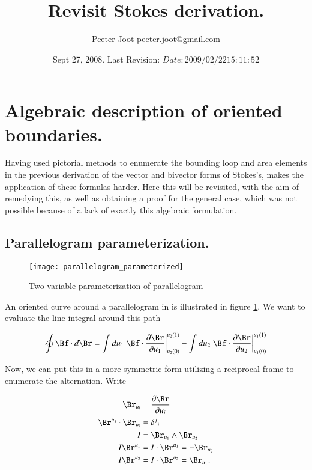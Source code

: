 \documentclass{article}
\title{ Revisit Stokes derivation. }
\author{Peeter Joot \quad peeter.joot@gmail.com}
\date{ Sept 27, 2008.  Last Revision: $Date: 2009/02/22 15:11:52 $ }
\newcommand{\PD}[2]{\frac{\partial {#2}}{\partial {#1}}}
\begin{document}
\maketitle{}

\tableofcontents

\section{ Algebraic description of oriented boundaries. }

Having used pictorial methods to enumerate the bounding loop and area elements 
\cite{PJStokes1}
in the previous derivation
of the vector and bivector forms of Stokes's, makes the application
of these formulas harder.  Here this will be revisited, with the aim of remedying this, as well as
obtaining a proof for the general case, which was not possible because of a lack of exactly this
algebraic formulation.

\subsection{ Parallelogram parameterization. }

\begin{figure}[htp]
\centering
\texttt{[image: parallelogram\_parameterized]}
\caption{Two variable parameterization of  parallelogram}\label{fig:parallelogram}
\end{figure}

An oriented curve around a parallelogram in  is illustrated in figure 
\ref{fig:parallelogram}.  We want to evaluate the line integral around this
path

\begin{align}\label{eqn:lineprep}
\ointclockwise \Bf \cdot d\Br
&=
\int du_1 \left.{\Bf \cdot \PD{u_1}{\Br} }\right\vert_{u_2(0)}^{u_2(1)}
-\int du_2 \left.{\Bf \cdot \PD{u_2}{\Br} }\right\vert_{u_1(0)}^{u_1(1)} \\
\end{align}

Now, we can put this in a more symmetric form utilizing a reciprocal 
frame to enumerate the alternation.  Write

\begin{align*}
\Br_{u_i} &= \PD{u_i}{\Br} \\
\Br^{u_j} \cdot \Br_{u_i} &= {\delta^j}_i \\
I &= \Br_{u_1} \wedge \Br_{u_2} \\
I \Br^{u_1} &=
I \cdot \Br^{u_1} =
- \Br_{u_2} \\
I \Br^{u_2} &=
I \cdot \Br^{u_2} =
 \Br_{u_1}.
\end{align*}
\end{document}
